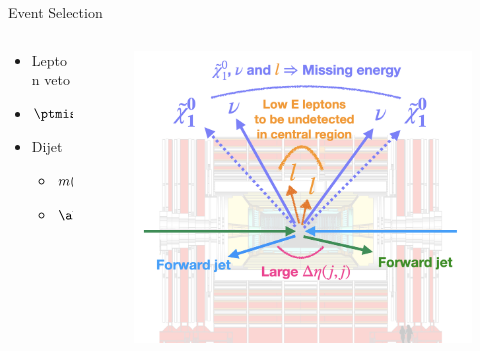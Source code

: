 \begin{frame}[fragile]{Event Selection}
  \begin{columns}
    \begin{column}{0.4\textwidth} 
      \begin{itemize}
          \item {\color{BurntOrange} Lepton veto}
          \item {\color{Periwinkle} $\ptmiss > 250\,\GeV$  }
          \item {\color{Rhodamine} Dijet}
            \begin{itemize}
              \item \(m(jj) > 500\,\GeV\)
              \item \(\abs{\Delta\eta(jj)} > 3.8\)
            \end{itemize}
      \end{itemize}

    \end{column}
    \begin{column}{0.6\textwidth}
      \begin{figure}[htpb]
        \centering
        \includegraphics[width=1\textwidth]{fig/final-state-topology.png}
      \end{figure}
 
    \end{column}
  \end{columns}
\end{frame}

